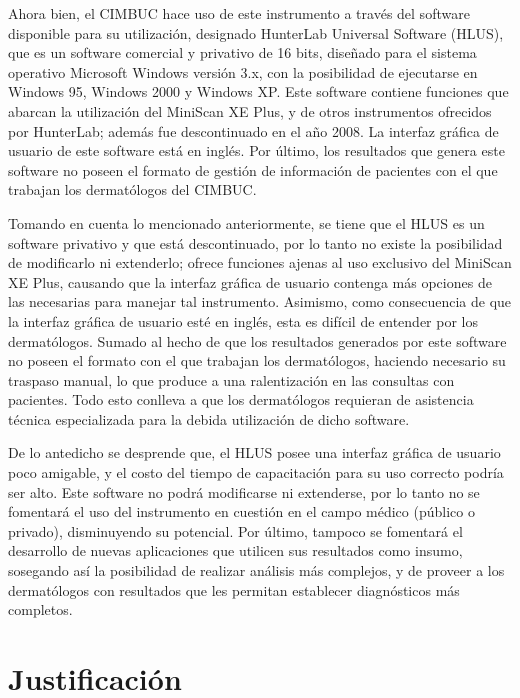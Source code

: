 Ahora bien, el CIMBUC hace uso de este instrumento a trav\'{e}s del software disponible para su utilizaci\'{o}n, designado HunterLab Universal Software (HLUS), que es un software comercial y privativo de 16 bits, dise\~{n}ado para el sistema operativo Microsoft Windows versi\'{o}n 3.x, con la posibilidad de ejecutarse en Windows 95, Windows 2000 y Windows XP. Este software contiene funciones que abarcan la utilizaci\'{o}n del MiniScan XE Plus, y de otros instrumentos ofrecidos por HunterLab; adem\'{a}s fue descontinuado en el a\~{n}o 2008. La interfaz gr\'{a}fica de usuario de este software est\'{a} en ingl\'{e}s. Por \'{u}ltimo, los resultados que genera este software no poseen el formato de gesti\'{o}n de informaci\'{o}n de pacientes con el que trabajan los dermat\'{o}logos del CIMBUC.

Tomando en cuenta lo mencionado anteriormente, se tiene que el HLUS es un software privativo y que est\'{a} descontinuado, por lo tanto no existe la posibilidad de modificarlo ni extenderlo; ofrece funciones ajenas al uso exclusivo del MiniScan XE Plus, causando que la interfaz gr\'{a}fica de usuario contenga m\'{a}s opciones de las necesarias para manejar tal instrumento. Asimismo, como consecuencia de que la interfaz gr\'{a}fica de usuario est\'{e} en ingl\'{e}s, esta es dif\'{i}cil de entender por los dermat\'{o}logos. Sumado al hecho de que los resultados generados por este software no poseen el formato con el que trabajan los dermat\'{o}logos, haciendo necesario su traspaso manual, lo que produce a una ralentizaci\'{o}n en las consultas con pacientes. Todo esto conlleva a que los dermat\'{o}logos requieran de asistencia t\'{e}cnica especializada para la debida utilizaci\'{o}n de dicho software.

De lo antedicho se desprende que, el HLUS posee una interfaz gr\'{a}fica de usuario poco amigable, y el costo del tiempo de capacitaci\'{o}n para su uso correcto podr\'{i}a ser alto. Este software no podr\'{a} modificarse ni extenderse, por lo tanto no se fomentar\'{a} el uso del instrumento en cuesti\'{o}n en el campo m\'{e}dico (p\'{u}blico o privado), disminuyendo su potencial. Por \'{u}ltimo, tampoco se fomentar\'{a} el desarrollo de nuevas aplicaciones que utilicen sus resultados como insumo, sosegando as\'{i} la posibilidad de realizar an\'{a}lisis m\'{a}s complejos, y de proveer a los dermat\'{o}logos con resultados que les permitan establecer diagn\'{o}sticos m\'{a}s completos.

	\section{Justificaci\'{o}n}

